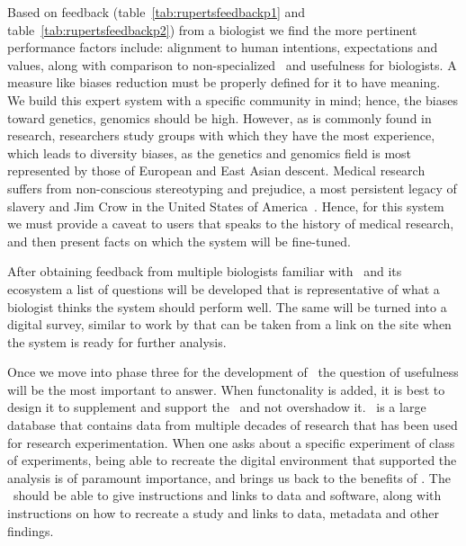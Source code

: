 Based on feedback (table~\ref{tab:rupertsfeedbackp1} and table~\ref{tab:rupertsfeedbackp2}) from a biologist we find the more pertinent performance factors include: alignment to human intentions, expectations and values, along with comparison to non-specialized \llms\, and usefulness for biologists.
A measure like biases reduction must be properly defined for it to have meaning.
We build this expert system with a specific community in mind; hence, the biases toward genetics, genomics should be high.
However, as is commonly found in research, researchers study groups with which they have the most experience, which leads to diversity biases, as the genetics and genomics field is most represented by those of European and East Asian descent.
Medical research suffers from non-conscious stereotyping and prejudice, a most persistent legacy of slavery and Jim Crow in the United States of America~\cite{Stone:2011}.
Hence, for this system we must provide a caveat to users that speaks to the history of medical research, and then present facts on which the system will be fine-tuned.
    

After obtaining feedback from multiple biologists familiar with \GN\ and its ecosystem a list of questions will be developed that is representative of what a biologist thinks the system should perform well. 
The same will be turned into a digital survey, similar to work by \cite{Blattgerste:2022} that can be taken from a link on the site when the system is ready for further analysis.

Once we move into phase three for the development of \project\ the question of usefulness will be the most important to answer.
When functonality is added, it is best to design it to supplement and support the \project\ and not overshadow it.
\GN\ is a large database that contains data from multiple decades of research that has been used for research experimentation.
When one asks about a specific experiment of class of experiments, being able to recreate the digital environment that supported the analysis is of paramount importance, and brings us back to the benefits of \guix.
The \project\ should be able to give instructions and links to data and software, along with instructions on how to recreate a study and links to data, metadata and other findings.

